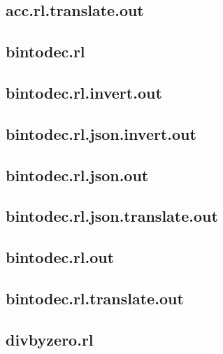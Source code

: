 \subsection{acc.rl.translate.out}
\label{app:acc_rl.translate.out}

\subsection{bintodec.rl}
\label{app:bintodec_rl}

\subsection{bintodec.rl.invert.out}
\label{app:bintodec_rl.invert.out}

\subsection{bintodec.rl.json.invert.out}
\label{app:bintodec_rl.json.invert.out}

\subsection{bintodec.rl.json.out}
\label{app:bintodec_rl.json.out}

\subsection{bintodec.rl.json.translate.out}
\label{app:bintodec_rl.json.translate.out}

\subsection{bintodec.rl.out}
\label{app:bintodec_rl.out}

\subsection{bintodec.rl.translate.out}
\label{app:bintodec_rl.translate.out}

\subsection{divbyzero.rl}
\label{app:divbyzero_rl}

